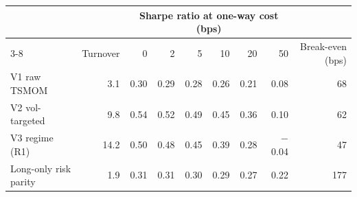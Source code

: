 \begin{tabular}{lrrrrrrrr}
\toprule
& & \multicolumn{6}{c}{Sharpe ratio at one-way cost (bps)} & \\
\cmidrule(lr){3-8}
 & Turnover & 0 & 2 & 5 & 10 & 20 & 50 & Break-even (bps) \\
\midrule
V1 raw TSMOM & 3.1 & 0.30 & 0.29 & 0.28 & 0.26 & 0.21 & 0.08 & 68 \\
V2 vol-targeted & 9.8 & 0.54 & 0.52 & 0.49 & 0.45 & 0.36 & 0.10 & 62 \\
V3 regime (R1) & 14.2 & 0.50 & 0.48 & 0.45 & 0.39 & 0.28 & $-$0.04 & 47 \\
Long-only risk parity & 1.9 & 0.31 & 0.31 & 0.30 & 0.29 & 0.27 & 0.22 & 177 \\
\bottomrule
\end{tabular}
